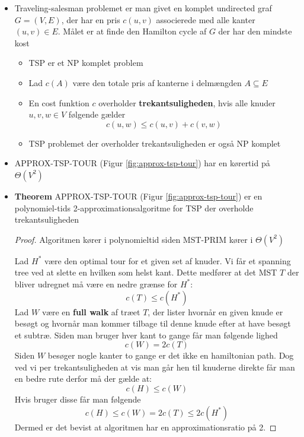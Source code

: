 \begin{itemize}
	\item Traveling-salesman problemet er man givet en komplet undirected graf $G = (V,E)$, der har en pris $c(u,v)$ associerede med alle kanter $(u,v) \in E$. Målet er at finde den Hamilton cycle af $G$ der har den mindste kost
  \begin{itemize}
    \item TSP er et NP komplet problem
    \item Lad $c(A)$ være den totale pris af kanterne i delmængden $A \subseteq E$ 
    \item En cost funktion $c$ overholder \textbf{trekantsuligheden}, hvis alle knuder $u,v,w \in V$ følgende gælder
    \begin{equation*}
      c(u,w) \leq c(u,v) + c(v,w) 
    \end{equation*}
    \item TSP problemet der overholder trekantsuligheden er også NP komplet
  \end{itemize}
  \item APPROX-TSP-TOUR (Figur \ref{fig:approx-tsp-tour}) har en kørertid på $\Theta(V^2)$ 
  \item \textbf{Theorem} APPROX-TSP-TOUR (Figur \ref{fig:approx-tsp-tour}) er en polynomiel-tids 2-approximationsalgoritme for TSP der overholde trekantsuligheden
  \begin{proof} 
    Algoritmen kører i polynomieltid siden MST-PRIM kører i $\Theta(V^2)$ \smallskip
    
    Lad $H^*$ være den optimal tour for et given set af knuder. Vi får et spanning tree ved at slette en hvilken som helst kant. Dette medfører at det MST $T$ der bliver udregnet må være en nedre grænse for $H^*$:
    \begin{equation*}
      c(T) \leq c(H^*) 
    \end{equation*}
    Lad $W$ være en \textbf{full walk} af træet $T$, der lister hvornår en given knude er besøgt og hvornår man kommer tilbage til denne knude efter at have besøgt et subtræ. Siden man bruger hver kant to gange får man følgende lighed
    \begin{equation*}
      c(W) = 2c(T) 
    \end{equation*}
    Siden $W$ besøger nogle kanter to gange er det ikke en hamiltonian path. Dog ved vi per trekantsuligheden at vis man går hen til knuderne direkte får man en bedre rute derfor må der gælde at:
    \begin{equation*}
      c(H) \leq c(W)
    \end{equation*}
    Hvis bruger disse får man følgende
    \begin{equation}
      c(H) \leq c(W) = 2c(T) \leq 2c(H^*) 
    \end{equation}
    Dermed er det bevist at algoritmen har en approximationsratio på 2.


\end{proof}
\end{itemize}
